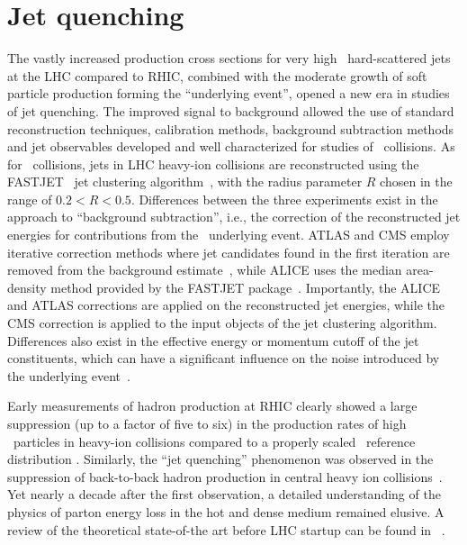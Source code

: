 \section{Jet quenching}
\label{jets_intro}

The vastly increased production cross sections for very high \pT\ hard-scattered jets at the LHC
compared to RHIC, combined with the moderate growth of soft particle production forming the ``underlying
event'', opened a new era in studies of jet quenching. The improved signal to background allowed the
use of standard reconstruction techniques, calibration methods, background subtraction methods and
jet observables developed and well characterized for studies of \pp\ collisions.
As for \pp\ collisions, jets in LHC heavy-ion collisions are reconstructed using
the FASTJET \ak\ jet clustering algorithm~\cite{Cacciari:2008gp}, with the
radius parameter $R$ chosen in the range of $0.2 < R  < 0.5$. Differences between the three
experiments exist in the approach to ``background subtraction'', i.e., the correction
of the reconstructed jet energies for contributions from the \PbPb\ underlying event.
ATLAS and CMS employ iterative correction methods where jet candidates found in
the first iteration are removed from the background estimate~\cite{Kodolova:2007hd,Grau:2008ed},
while ALICE uses the median area-density method provided by the FASTJET package~\cite{Cacciari:2011ma}.
Importantly, the ALICE and ATLAS corrections are applied on the reconstructed jet energies,
while the CMS correction is applied to the input objects of the jet clustering algorithm.
Differences also exist in the effective energy or momentum cutoff of the jet constituents,
which can have a significant influence on the noise introduced by the underlying event~\cite{Abelev:2012ej}.

Early measurements of hadron production at RHIC
clearly showed a large suppression (up to a factor of five to six) in the production rates of
high \pT\ particles in heavy-ion collisions compared to a properly scaled \pp\ reference distribution
\cite{Adcox:2001jp,Adler:2002xw}. Similarly, the ``jet quenching'' phenomenon was observed
in the suppression of back-to-back hadron production
in central heavy ion collisions~\cite{Adcox:2001jp,Adler:2002xw}. Yet nearly a decade after the first observation, a detailed
understanding of the physics of parton energy loss in the hot and dense medium remained
elusive. A review of the theoretical state-of-the art before LHC startup can be
found in ~\cite{Wiedemann:2009sh}.

